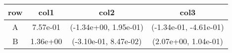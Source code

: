 \begin{tabular}{cccc}
\toprule
row&col1&col2&col3\tabularnewline
\midrule
A&7.57e-01& (-1.34e+00, 1.95e-01)& (-1.34e-01, -4.61e-01)\tabularnewline
B&1.36e+00& (-3.10e-01, 8.47e-02)& (2.07e+00, 1.04e-01)\tabularnewline
\bottomrule
\end{tabular}
